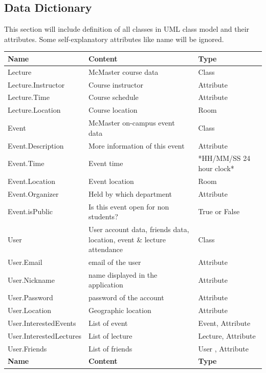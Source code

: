 \documentclass[12pt]{article}
\begin{document}
\subsection{Data Dictionary}
This section will include definition of all classes in UML class model and their attributes. Some self-explanatory attributes like name will be ignored.
\begin{longtable}
 {p{} | p{} | p{}}
  \toprule
  \textbf{Name} & \textbf{Content} & \textbf{Type}\\
  \midrule
  Lecture & McMaster course data & Class\\
  \midrule
  Lecture.Instructor & Course instructor & Attribute\\
  \midrule
  Lecture.Time & Course schedule & Attribute\\
  \midrule
  Lecture.Location & Course location & Room\\
  \midrule
  Event & McMaster on-campus event data & Class\\
  \midrule
    Event.Description & More information of this event & Attribute\\
  \midrule
  Event.Time & Event time & *HH/MM/SS
24 hour clock*\\
  \midrule
  Event.Location & Event location & Room\\
  \midrule
  Event.Organizer & Held by which department & Attribute\\
  \midrule
  Event.isPublic & Is this event open for non students? & True or False\\
  \midrule
  User & User account data, friends data, location,  event \& lecture attendance & Class\\
  \midrule
  User.Email & email of the user & Attribute\\
  \midrule
  User.Nickname & name displayed in the application & Attribute\\
  \midrule
  User.Password & password of the account & Attribute\\
  \midrule
  User.Location & Geographic location & Attribute\\
  \midrule
  User.InterestedEvents & List of event & Event, Attribute\\
  \midrule
  User.InterestedLectures & List of lecture & Lecture, Attribute\\
  \midrule
  User.Friends & List of friends & User , Attribute\\
  \midrule
  \textbf{Name} & \textbf{Content} & \textbf{Type}\\

\end{longtable}
\end{document}
